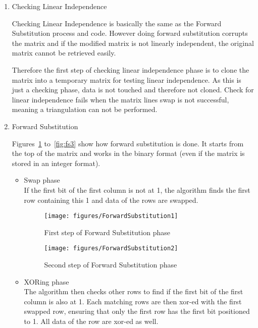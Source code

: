 \documentclass[a4paper,twoside]{article}
\begin{document}
\begin{enumerate}
\item Checking Linear Independence

Checking Linear Independence is basically the same as the Forward Substitution process and code. However doing forward substitution corrupts the matrix and if the modified matrix is not linearly independent, the original matrix cannot be retrieved easily.

Therefore the first step of checking linear independence phase is to clone the matrix into a temporary matrix for testing linear independence. As this is just a checking phase, data is not touched and therefore not cloned. Check for linear independence fails when the matrix lines swap is not successful, meaning a triangulation can not be performed. 

\item Forward Substitution

Figures~\ref{fig:fs1} to~\ref{fig:fs3} show how forward substitution is done. It starts from the top of the matrix and works in the binary format (even if the matrix is stored in an integer format).

\begin{itemize} 
\item Swap phase \hfill \\
If the first bit of the first column is not at 1, the algorithm finds the first row containing this 1 and data of the rows are swapped.

\begin{figure}[!hbt]
\centering
\texttt{[image: figures/ForwardSubstitution1]}
\caption{First step of Forward Substitution phase}
\label{fig:fs1}
\end{figure}

\begin{figure}[!hbt]
\centering
\texttt{[image: figures/ForwardSubstitution2]}
\caption{Second step of Forward Substitution phase}
\label{fig:fs2}
\end{figure}

\item XORing phase \hfill \\
The algorithm then checks other rows to find if the first bit of the first column is also at 1. Each matching rows are then xor-ed with the first swapped row, ensuring that only the first row has the first bit positioned to 1. All data of the row are xor-ed as well.
\end{itemize}


\end{enumerate}
\end{document}

